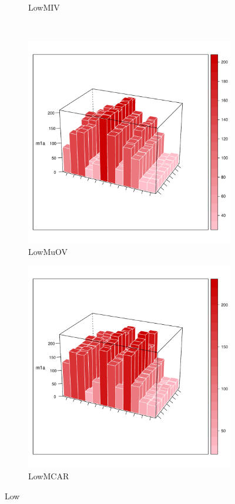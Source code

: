 \documentclass{article}
\begin{document}
\begin{figure}
\begin{subfigure}[b]{0.45\textwidth}
			\caption{LowMIV}
			\label{fig:LowMIV}
		\end{subfigure}
		\newline
		~ %
		\begin{subfigure}[b]{0.45\textwidth}
			\includegraphics[width=\textwidth]{Low/MuOV.pdf}
			\caption{LowMuOV}
			\label{fig:LowMuOV}
		\end{subfigure}
		\begin{subfigure}[b]{0.45\textwidth}
			\includegraphics[width=\textwidth]{Low/MCAR.pdf}
			\caption{LowMCAR}
			\label{fig:LowMCAR}
		\end{subfigure}
		\caption{Low}\label{fig:Low}
	\end{figure}
	
\end{document}
